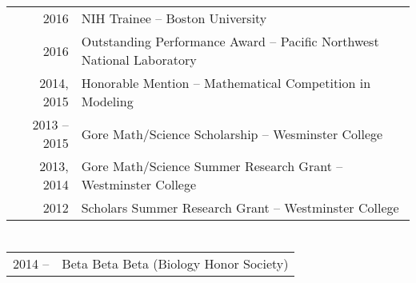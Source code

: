 \documentclass[a4paper,10pt]{article}
\begin{document}
\section{\color{linkcolour}{Awards and Accolades}}
\begin{tabular}{rl}
2016 & NIH Trainee -- Boston University \\
2016 & Outstanding Performance Award -- Pacific Northwest National Laboratory
\\ 2014, 2015 & Honorable Mention -- Mathematical Competition in Modeling
\\ 2013 -- 2015&  Gore Math/Science Scholarship -- Wesminster College
\\ 2013, 2014& Gore Math/Science Summer Research Grant -- Westminster College
\\ 2012 & Scholars Summer Research Grant -- Westminster College
\end{tabular}

\section{\color{linkcolour}{Professional Affiliations}}
\begin{tabular}{rl}
2014 -- & Beta Beta Beta (Biology Honor Society) \\
\end{tabular}
\end{document}
